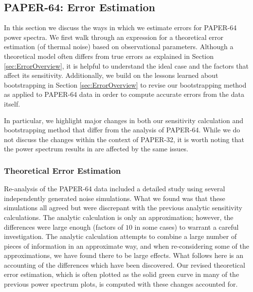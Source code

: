 \documentclass[preprint2,numberedappendix,tighten]{aastex6}
\begin{document}

\subsection{PAPER-64: Error Estimation}
\label{sec:Error}

In this section we discuss the ways in which we estimate errors for PAPER-64 power spectra. We first walk through an expression for a theoretical error estimation (of thermal noise) based on observational parameters. Although a theoretical model often 
differs from true errors as explained in Section \ref{sec:ErrorOverview}, it is helpful to understand the ideal case and the factors 
that affect its sensitivity. Additionally, we build on the lessons learned about bootstrapping in Section \ref{sec:ErrorOverview} to 
revise our bootstrapping method as applied to PAPER-64 data in order to compute accurate errors from the data itself.

In particular, we highlight major changes in both our sensitivity calculation and bootstrapping method that differ from the  
analysis of PAPER-64. While we do not discuss the changes within the context of PAPER-32, it is worth noting that the power 
spectrum results in \citet{parsons_et_al2014} are affected by the same issues.

\subsubsection{Theoretical Error Estimation}
\label{sec:PSSense}

Re-analysis of the PAPER-64 data included a detailed study using several independently generated noise simulations. What we 
found was that these simulations all agreed but were discrepant with the previous analytic sensitivity calculations. The analytic 
calculation is only an approximation; however, the differences were large enough (factors of $10$ in some cases) to warrant a 
careful investigation. The analytic calculation attempts to combine a large number of pieces of information in an approximate 
way, and when re-considering some of the approximations, we have found there to be large effects. What follows here is an 
accounting of the differences which have been discovered. Our revised theoretical error estimation, which is often plotted as the solid green curve in many of the previous power spectrum plots, is computed with these changes accounted for.
\end{document}
